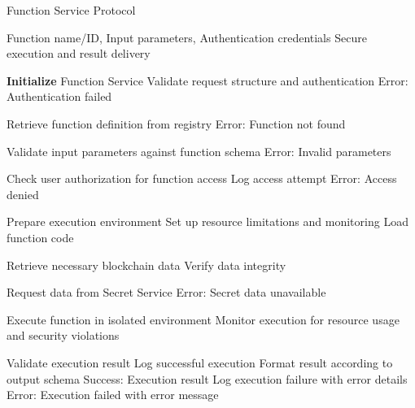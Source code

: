 \begin{algorithm}
\caption{Function Service Protocol}
\label{alg:function-service}
\begin{algorithmic}[1]
\Require Function name/ID, Input parameters, Authentication credentials
\Ensure Secure execution and result delivery

\State \textbf{Initialize} Function Service
\State Validate request structure and authentication
    \State \Return Error: Authentication failed
\EndIf

\State Retrieve function definition from registry
    \State \Return Error: Function not found
\EndIf

\State Validate input parameters against function schema
    \State \Return Error: Invalid parameters
\EndIf

\State Check user authorization for function access
    \State Log access attempt
    \State \Return Error: Access denied
\EndIf

\State Prepare execution environment
\State Set up resource limitations and monitoring
\State Load function code

    \State Retrieve necessary blockchain data
    \State Verify data integrity
\EndIf

    \State Request data from Secret Service
        \State \Return Error: Secret data unavailable
    \EndIf
\EndIf

\State Execute function in isolated environment
\State Monitor execution for resource usage and security violations

    \State Validate execution result
    \State Log successful execution
    \State Format result according to output schema
    \State \Return Success: Execution result
\Else
    \State Log execution failure with error details
    \State \Return Error: Execution failed with error message
\EndIf

\end{algorithmic}
\end{algorithm} 